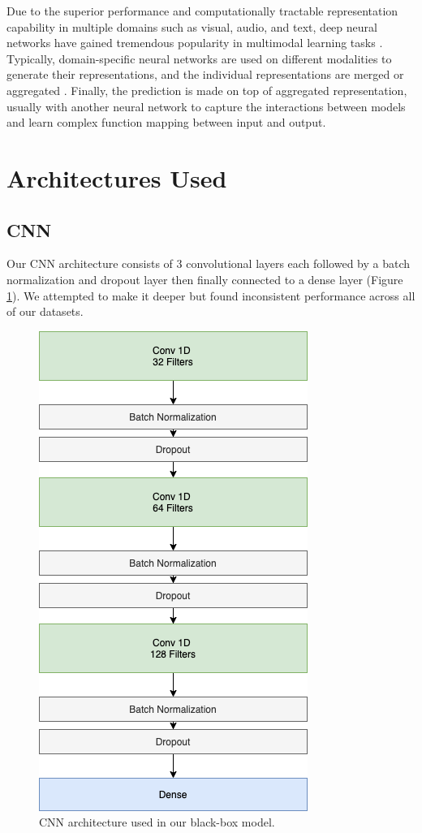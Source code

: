 \documentclass{turabian-thesis}[12pt]
\begin{document}
Due to the superior performance and computationally tractable representation capability in multiple domains such as visual, audio, and text, deep neural networks have gained tremendous popularity in multimodal learning tasks \cite{kim_multimodal_2018}. Typically, domain-specific neural networks are used on different modalities to generate their representations, and the individual representations are merged or aggregated \cite{liu_learn_2018}. Finally, the prediction is made on top of aggregated representation, usually with another neural network to capture the interactions between models and learn complex function mapping between input and output.


\section{Architectures Used}

\subsection{CNN}

Our CNN architecture consists of 3 convolutional layers each followed by a batch normalization and dropout layer then finally connected to a dense layer (Figure \ref{fig:cnn_model}). We attempted to make it deeper but found inconsistent performance across all of our datasets.

\begin{figure}[h!]
   \begin{center}
      \includegraphics[scale=0.6]{../media/cnn_model.png}
   \end{center}
   \caption{CNN architecture used in our black-box model.}
    \label{fig:cnn_model}
\end{figure}
\end{document}
